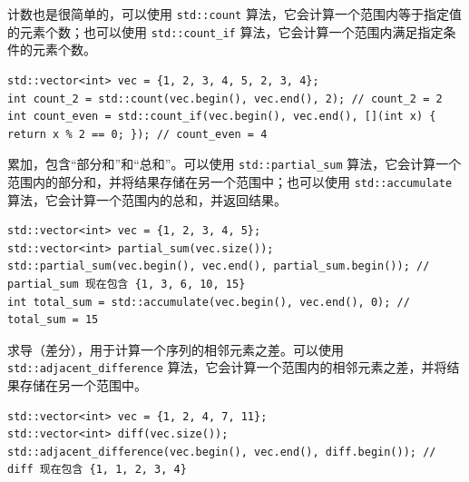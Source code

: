 计数也是很简单的，可以使用 \verb|std::count| 算法，它会计算一个范围内等于指定值的元素个数；也可以使用 \verb|std::count_if| 算法，它会计算一个范围内满足指定条件的元素个数。
\begin{verbatim}
std::vector<int> vec = {1, 2, 3, 4, 5, 2, 3, 4};
int count_2 = std::count(vec.begin(), vec.end(), 2); // count_2 = 2
int count_even = std::count_if(vec.begin(), vec.end(), [](int x) { return x % 2 == 0; }); // count_even = 4
\end{verbatim}

累加，包含“部分和”和“总和”。可以使用 \verb|std::partial_sum| 算法，它会计算一个范围内的部分和，并将结果存储在另一个范围中；也可以使用 \verb|std::accumulate| 算法，它会计算一个范围内的总和，并返回结果。
\begin{verbatim}
std::vector<int> vec = {1, 2, 3, 4, 5};
std::vector<int> partial_sum(vec.size());
std::partial_sum(vec.begin(), vec.end(), partial_sum.begin()); // partial_sum 现在包含 {1, 3, 6, 10, 15}
int total_sum = std::accumulate(vec.begin(), vec.end(), 0); // total_sum = 15
\end{verbatim}

求导（差分），用于计算一个序列的相邻元素之差。可以使用 \verb|std::adjacent_difference| 算法，它会计算一个范围内的相邻元素之差，并将结果存储在另一个范围中。
\begin{verbatim}
std::vector<int> vec = {1, 2, 4, 7, 11};
std::vector<int> diff(vec.size());
std::adjacent_difference(vec.begin(), vec.end(), diff.begin()); // diff 现在包含 {1, 1, 2, 3, 4}
\end{verbatim}


